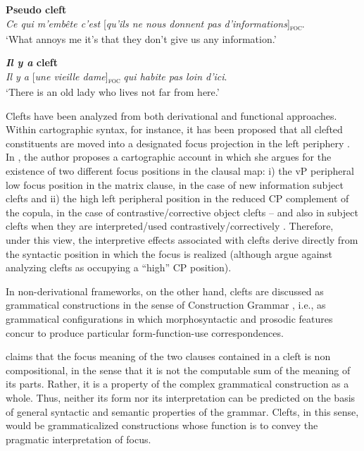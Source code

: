 \z

\ea \label{ex32} \textbf{Pseudo cleft}\\
\textit{Ce qui m'embête c'est} {[\textit{qu'ils ne nous donnent pas d'informations}]\textsubscript{\textsc{foc}}}\normalsize.\\
`What annoys me it's that they don't give us any information.'

\z

\ea \label{ex33}\textbf{\textit{Il y a} cleft}\\
\textit{Il y a} {[\textit{une vieille dame}]\textsubscript{\textsc{foc}}} \normalsize \textit{qui habite pas loin d'ici}.\\
`There is an old lady who lives not far from here.'

\z

Clefts have been analyzed from both derivational and functional approaches. Within cartographic syntax, for instance, it has been proposed that all clefted constituents are moved into a designated focus projection in the left periphery \parencite{kiss1998identificational, kiss1999english}. In \textcite{belletti2008answering, belletti2008cp, belletti2012revisiting}, the author proposes a cartographic account in which she argues for the existence of two different focus positions in the clausal map: i) the vP peripheral low focus position in the matrix clause, in the case of new information subject clefts and ii) the high left peripheral position in the reduced CP complement of the copula, in the case of contrastive/corrective object clefts – and also in subject clefts when they are interpreted/used contrastively/correctively \parencite[96]{belletti2012revisiting}. Therefore, under this view, the interpretive effects associated with clefts derive directly from the syntactic position in which the focus is realized (although \cite{haegeman2014architecture} argue against analyzing clefts as occupying a ``high” CP position).

In non-derivational frameworks, on the other hand, clefts are discussed as grammatical constructions in the sense of Construction Grammar \parencite{fillmore1988mechanisms}, i.e., as grammatical  configurations  in  which  morphosyntactic  and prosodic features concur to produce particular form-function-use correspondences.

\textcite{lambrecht1996information} claims that the focus meaning of the two clauses contained in a cleft is non compositional, in the sense that it is not the computable sum of the meaning of its parts. Rather, it is a property of the complex grammatical construction as a whole. Thus, neither its form nor its interpretation can be predicted on the basis of general syntactic and semantic properties of the grammar. Clefts, in this sense, would be grammaticalized constructions whose function is to convey the pragmatic interpretation of focus. 

